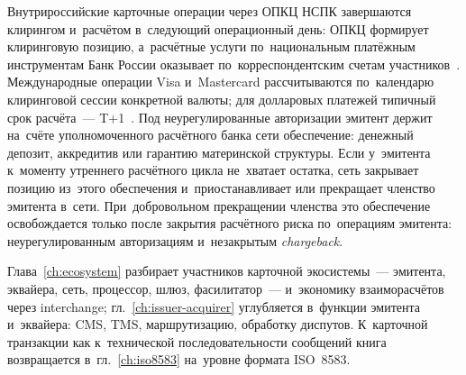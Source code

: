 Внутрироссийские карточные операции через ОПКЦ НСПК завершаются клирингом
и~расчётом в~следующий операционный день: ОПКЦ формирует клиринговую позицию,
а~расчётные услуги по~национальным платёжным инструментам Банк России оказывает
по~корреспондентским счетам участников~\cite{fz-161}. Международные операции
Visa и~Mastercard рассчитываются по~календарю клиринговой сессии конкретной
валюты; для долларовых платежей типичный срок расчёта~---
T+1~\cite{visa-core-rules,mc-gcms-rm-2021}. Под неурегулированные
авторизации эмитент держит на~счёте уполномоченного расчётного банка сети
обеспечение: денежный депозит,
аккредитив или гарантию материнской структуры. Если у~эмитента к~моменту
утреннего расчётного цикла не~хватает остатка, сеть закрывает позицию из~этого
обеспечения и~приостанавливает или прекращает членство эмитента в~сети.
При~добровольном прекращении членства это обеспечение освобождается только
после закрытия расчётного риска по~операциям эмитента: неурегулированным
авторизациям и~незакрытым \textit{chargeback}.

Глава~\ref{ch:ecosystem} разбирает участников карточной экосистемы~---
эмитента, эквайера, сеть, процессор, шлюз, фасилитатор~--- и~экономику
взаиморасчётов через interchange; гл.~\ref{ch:issuer-acquirer} углубляется
в~функции эмитента и~эквайера: CMS, TMS, маршрутизацию, обработку диспутов.
К~карточной транзакции как к~технической последовательности сообщений книга
возвращается в~гл.~\ref{ch:iso8583} на~уровне формата ISO~8583.
